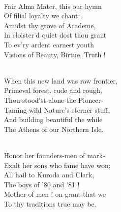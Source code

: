 \documentclass[10pt,b5j]{tarticle} %
\begin{document}
\vspace{1.5em} %
\newcommand{\linespace}{0.5em} %
\newcommand{\blocksize}{0.5\hsize} %
\newcommand{\itemmargin}{6em} %
\begin{enumerate} %
    \setlength{\itemindent}{\itemmargin} %
    \begin{minipage}[c]{\blocksize}
    
        \vspace{\linespace}
        \item~\\
        Fair Alma Mater, this our hymn\\
          Of filial loyalty we chant;\\
        Amidst thy grove of Academe,\\
          In cloister'd quiet dost thou grant\\
            To ev'ry ardent earnest youth\\
            Visions of Beauty, Birtue, Truth !
        
        \vspace{\linespace}
        \item~\\
        When this new land was raw frontier,\\
          Primeval forest, rude and rough,\\
        Thou stood'st alone-the Pioneer-\\
          Taming wild Nature's sterner stuff,\\
            And building beautiful the while\\
            The Athens of our Northern Isle.
        
        \vspace{\linespace}
        \item~\\
        Honor her founders-men of mark-\\
          Exalt her sons who fame have won;\\
        All hail to Kuroda and Clark,\\
          The boys of '80 and '81 !\\
            Mother of men ! on grant that we\\
            To thy traditions true may be.
        

\end{minipage}
\end{enumerate}
\end{document}

